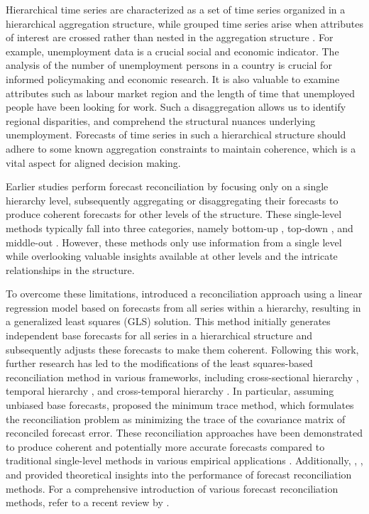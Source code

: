 \documentclass[11pt,a4paper,]{article}
\begin{document}
Hierarchical time series are characterized as a set of time series
organized in a hierarchical aggregation structure, while grouped time
series arise when attributes of interest are crossed rather than nested
in the aggregation structure \autocite{Hyndman2016-cz}. For example,
unemployment data is a crucial social and economic indicator. The
analysis of the number of unemployment persons in a country is crucial
for informed policymaking and economic research. It is also valuable to
examine attributes such as labour market region and the length of time
that unemployed people have been looking for work. Such a disaggregation
allows us to identify regional disparities, and comprehend the
structural nuances underlying unemployment. Forecasts of time series in
such a hierarchical structure should adhere to some known aggregation
constraints to maintain coherence, which is a vital aspect for aligned
decision making.

Earlier studies perform forecast reconciliation by focusing only on a
single hierarchy level, subsequently aggregating or disaggregating their
forecasts to produce coherent forecasts for other levels of the
structure. These single-level methods typically fall into three
categories, namely bottom-up \autocite{Dunn1976-op}, top-down
\autocite{Gross1990-lg}, and middle-out
\autocite{Athanasopoulos2009-ps}. However, these methods only use
information from a single level while overlooking valuable insights
available at other levels and the intricate relationships in the
structure.

To overcome these limitations, \textcite{Hyndman2011-sd} introduced a
reconciliation approach using a linear regression model based on
forecasts from all series within a hierarchy, resulting in a generalized
least squares (GLS) solution. This method initially generates
independent base forecasts for all series in a hierarchical structure
and subsequently adjusts these forecasts to make them coherent.
Following this work, further research has led to the modifications of
the least squares-based reconciliation method in various frameworks,
including cross-sectional hierarchy
\autocite{Hyndman2016-cz,Wickramasuriya2019-fc,Panagiotelis2021-mf},
temporal hierarchy \autocite{Athanasopoulos2017-jj,Nystrup2020-di}, and
cross-temporal hierarchy \autocite{Di_Fonzo2023-vo}. In particular,
assuming unbiased base forecasts, \textcite{Wickramasuriya2019-fc}
proposed the minimum trace method, which formulates the reconciliation
problem as minimizing the trace of the covariance matrix of reconciled
forecast error. These reconciliation approaches have been demonstrated
to produce coherent and potentially more accurate forecasts compared to
traditional single-level methods in various empirical applications
\autocites[see, for
example,][]{Taieb2021-tc,Panagiotelis2021-mf,Wickramasuriya2023-hn}.
Additionally, \textcite{Van_Erven2015-ir},
\textcite{Wickramasuriya2019-fc}, and \textcite{Panagiotelis2021-mf}
provided theoretical insights into the performance of forecast
reconciliation methods. For a comprehensive introduction of various
forecast reconciliation methods, refer to a recent review by
\textcite{Athanasopoulos2023-sm}.
\end{document}
